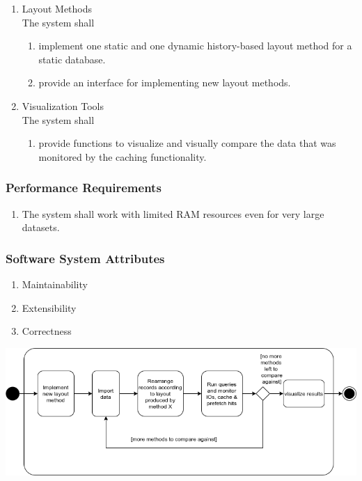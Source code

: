 \begin{enumerate}[label*=\arabic*]
\item Layout Methods \\
    The system shall
\begin{enumerate}[label*=\arabic*]
	\item implement one static and one dynamic history-based layout method for a static database.
	\item provide an interface for implementing new layout methods.
\end{enumerate}

\item Visualization Tools \\
    The system shall
\begin{enumerate}[label*=\arabic*]
    \item provide functions to visualize and visually compare the data that was monitored by the caching functionality.
\end{enumerate}
\end{enumerate}

\subsubsection{Performance Requirements}
\begin{enumerate}[label*=\arabic*]
		\item The system shall work with limited RAM resources even for very large datasets.
\end{enumerate}

\subsubsection{Software System Attributes}
\begin{enumerate}[label*=\arabic*]
    \item Maintainability
    \item Extensibility
    \item Correctness
\end{enumerate} \vspace{2em}
		
		
\begin{center}
 \includegraphics[keepaspectratio, width=1\textwidth, height=\textheight]{img/activity.png}
\end{center}
		\newpage
		
